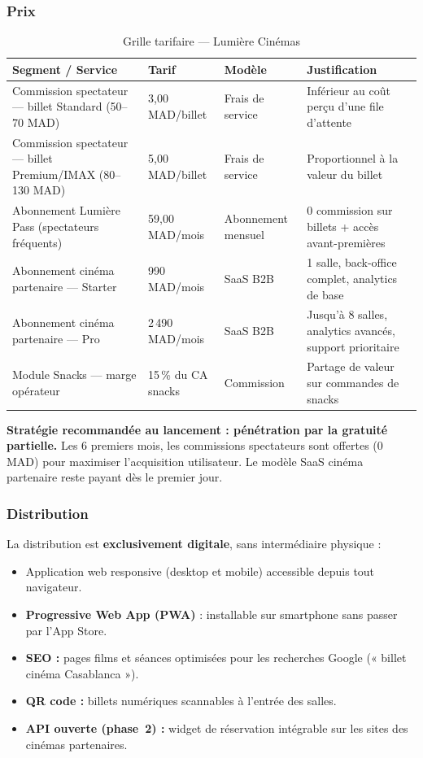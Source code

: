\documentclass[12pt,a4paper,openany]{report}
\begin{document}
\subsubsection{Prix}

\begin{table}[H]
\centering
\small
\begin{tabularx}{\textwidth}{p{4.8cm}p{2.6cm}p{2.8cm}X}
\toprule
\textbf{Segment / Service} & \textbf{Tarif} & \textbf{Modèle} & \textbf{Justification} \\
\midrule
Commission spectateur — billet Standard (50–70 MAD) & 3,00 MAD/billet & Frais de service & Inférieur au coût perçu d'une file d'attente \\
Commission spectateur — billet Premium/IMAX (80–130 MAD) & 5,00 MAD/billet & Frais de service & Proportionnel à la valeur du billet \\
Abonnement Lumière Pass (spectateurs fréquents) & 59,00 MAD/mois & Abonnement mensuel & 0 commission sur billets + accès avant-premières \\
Abonnement cinéma partenaire — Starter & 990 MAD/mois & SaaS B2B & 1 salle, back-office complet, analytics de base \\
Abonnement cinéma partenaire — Pro & 2\,490 MAD/mois & SaaS B2B & Jusqu'à 8 salles, analytics avancés, support prioritaire \\
Module Snacks — marge opérateur & 15\,\% du CA snacks & Commission & Partage de valeur sur commandes de snacks \\
\bottomrule
\end{tabularx}
\caption{Grille tarifaire — Lumière Cinémas}
\label{tab:tarifs}
\end{table}

\noindent\textbf{Stratégie recommandée au lancement : pénétration par la gratuité partielle.} Les 6 premiers mois, les commissions spectateurs sont offertes (0 MAD) pour maximiser l'acquisition utilisateur. Le modèle SaaS cinéma partenaire reste payant dès le premier jour.

\subsubsection{Distribution}

La distribution est \textbf{exclusivement digitale}, sans intermédiaire physique :
\begin{itemize}
  \item Application web responsive (desktop et mobile) accessible depuis tout navigateur.
  \item \textbf{Progressive Web App (PWA)} : installable sur smartphone sans passer par l'App Store.
  \item \textbf{SEO :} pages films et séances optimisées pour les recherches Google (« billet cinéma Casablanca »).
  \item \textbf{QR code :} billets numériques scannables à l'entrée des salles.
  \item \textbf{API ouverte (phase~2) :} widget de réservation intégrable sur les sites des cinémas partenaires.
\end{itemize}
\end{document}
